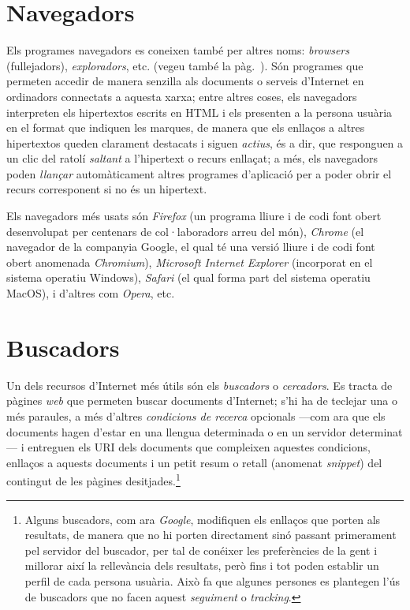 \section{Navegadors}
\label{ss:navegadors}
Els programes navegadors es coneixen també per altres noms:
\emph{browsers} (fullejadors), \emph{exploradors}, etc. (vegeu també
la pàg.~\pageref{pg:navegadors}).  Són programes que permeten accedir
de manera senzilla als documents o serveis d'Internet en ordinadors
connectats a aquesta xarxa; entre altres coses, els navegadors
interpreten els hipertextos escrits en HTML i els presenten a la
persona usuària en el format que indiquen les marques, de manera que
els enllaços a altres hipertextos queden clarament destacats i siguen
\emph{actius}, és a dir, que responguen a un clic del ratolí
\emph{saltant} a l'hipertext o recurs enllaçat; a més, els navegadors
poden \emph{llançar} automàticament altres programes d'aplicació per a
poder obrir el recurs corresponent si no és un hipertext. 

Els navegadors més usats són \emph{Firefox} (un programa lliure i de
codi font obert desenvolupat per centenars de col·laboradors arreu del
món), \emph{Chrome} (el navegador de la companyia Google, el qual té
una versió lliure i de codi font obert anomenada \emph{Chromium}),
\emph{Microsoft Internet Explorer} (incorporat en el sistema operatiu
Windows), \emph{Safari} (el qual forma part del sistema operatiu
MacOS), i d'altres com \emph{Opera}, etc.
 

\section{Buscadors}
Un dels recursos d'Internet més útils són els \emph{buscadors} o
\emph{cercadors}. Es tracta de pàgines \emph{web} que permeten buscar
documents d'Internet; s'hi ha de teclejar una o més paraules, a més
d'altres \emph{condicions de recerca} opcionals ---com ara que els
documents hagen d'estar en una llengua determinada o en un servidor
determinat--- i entreguen els URI dels documents que compleixen
aquestes condicions, enllaços a aquests documents i un petit resum o
retall (anomenat \emph{snippet}) del contingut de les pàgines
desitjades.\footnote{Alguns buscadors, com ara \emph{Google},
  modifiquen els enllaços que porten als resultats, de manera que no
  hi porten directament sinó passant primerament pel servidor del
  buscador, per tal de conéixer les preferències de la gent i millorar
  així la rellevància dels resultats, però fins i tot poden establir
  un perfil de cada persona usuària. Això fa que algunes persones es
  plantegen l'ús de buscadors que no facen aquest \emph{seguiment} o
  \emph{tracking}.}

